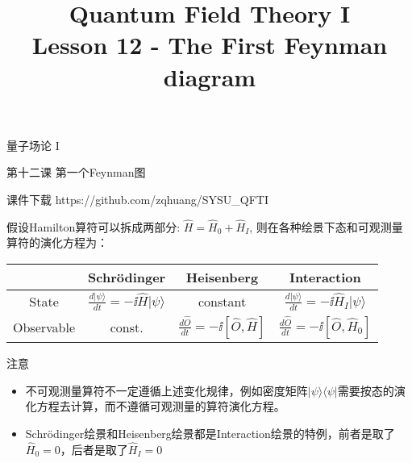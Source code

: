 \documentclass[CJK]{beamer}
\title{Quantum Field Theory I \\ Lesson 12 - The First Feynman diagram}
\author{}
\date{}
\begin{document}
\begin{frame}
 
\begin{center}
\begin{Large}
\bch
量子场论 I 

{\vskip 0.3in}

第十二课 第一个Feynman图

\ech
\end{Large}
\end{center}

\vskip 0.2in

\bch
课件下载
\ech
https://github.com/zqhuang/SYSU\_QFTI

\end{frame}


\begin{frame} 
\bch
假设Hamilton算符可以拆成两部分: $\hat{H} = \hat{H}_0 + \hat{H}_I$, 则在各种绘景下态和可观测量算符的演化方程为：

\begin{tabular}{c|c|c|c}
\hline
\hline
            & Schr\"odinger & Heisenberg  & Interaction \\
\hline
State         & $\frac{d |\psi\rangle}{dt} = - \ii \hat{H}|\psi\rangle$ & constant & $\frac{d |\psi\rangle}{dt} = - \ii \hat{H}_I|\psi\rangle$  \\
\hline
Observable & const. & $\frac{d\hat{O}}{dt} = -\ii [ \hat{O}, \hat{H} ]$ & $\frac{d\hat{O}}{dt} = -\ii [ \hat{O}, \hat{H}_0 ]$ \\
\hline
\end{tabular}

注意
\begin{itemize}
\item{不可观测量算符不一定遵循上述变化规律，例如密度矩阵$|\psi\rangle\langle\psi|$需要按态的演化方程去计算，而不遵循可观测量的算符演化方程。}
\item{Schr\"odinger绘景和Heisenberg绘景都是Interaction绘景的特例，前者是取了$\hat{H}_0 = 0$，后者是取了$\hat{H}_I = 0$}
\end{itemize}

\ech
\end{frame}
\end{document}
